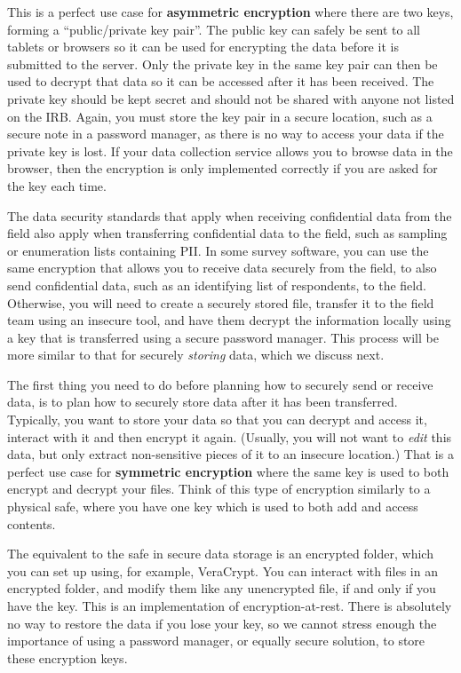 This is a perfect use case for \textbf{asymmetric encryption}
where there are two keys, forming a ``public/private key pair''.
The public key can safely be sent to all tablets or browsers
so it can be used for encrypting the data before it is submitted to the server.
Only the private key in the same key pair can then be used to decrypt that data
so it can be accessed after it has been received.
The private key should be kept secret and
should not be shared with anyone not listed on the IRB.
Again, you must store the key pair in a secure location,
such as a secure note in a password manager,
as there is no way to access your data if the private key is lost.
If your data collection service allows you to browse data in the browser,
then the encryption is only implemented correctly if you are asked for the key each time.

The data security standards that apply
when receiving confidential data from the field
also apply when transferring confidential data to the field,
such as sampling or enumeration lists containing PII.
In some survey software,
you can use the same encryption that allows you to receive data securely
from the field, to also send confidential data,
such as an identifying list of respondents, to the field.
Otherwise, you will need to create a securely stored file,
transfer it to the field team using an insecure tool,
and have them decrypt the information locally
using a key that is transferred using a secure password manager.
This process will be more similar to that for securely \textit{storing} data,
which we discuss next.

The first thing you need to do before planning how to securely send or receive data,
is to plan how to securely store data after it has been transferred.
Typically, you want to store your data so that you can decrypt and access it,
interact with it and then encrypt it again.
(Usually, you will not want to \textit{edit} this data,
but only extract non-sensitive pieces of it to an insecure location.)
That is a perfect use case for \textbf{symmetric encryption}
where the same key is used to both encrypt and decrypt your files.
Think of this type of encryption similarly to a physical safe,
where you have one key which is used to both add and access contents.

The equivalent to the safe in secure data storage is an encrypted folder,
which you can set up using, for example, VeraCrypt.
You can interact with files in an encrypted folder,
and modify them like any unencrypted file,
if and only if you have the key.
This is an implementation of encryption-at-rest.
There is absolutely no way to restore the data if you lose your key,
so we cannot stress enough the importance of using a password manager,
or equally secure solution, to store these encryption keys.


